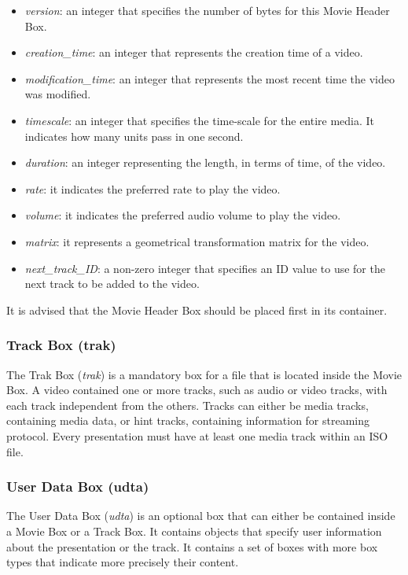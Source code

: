 \begin{itemize}
\item \emph{version}: an integer that specifies the number of bytes for this Movie Header Box.
\item \emph{creation\_time}: an integer that represents the creation time of a video.
\item \emph{modification\_time}: an integer that represents the most recent time the video was modified.
\item \emph{timescale}: an integer that specifies the time-scale for the entire media. It indicates how many units pass in one second.
\item \emph{duration}: an integer representing the length, in terms of time, of the video.
\item \emph{rate}: it indicates the preferred rate to play the video.
\item \emph{volume}: it indicates the preferred audio volume to play the video.
\item \emph{matrix}: it represents a geometrical transformation matrix for the video.
\item \emph{next\_track\_ID}: a non-zero integer that specifies an ID value to use for the next track to be added to the video.
\end{itemize}

It is advised that the Movie Header Box should be placed first in its container.

\subsubsection*{Track Box (trak)}

The Trak Box (\emph{trak}) is a mandatory box for a file that is located inside the Movie Box. A video contained one or more tracks, such as audio or video tracks, with each track independent from the others. Tracks can either be media tracks, containing media data, or hint tracks, containing information for streaming protocol. Every presentation must have at least one media track within an ISO file.

\subsubsection*{User Data Box (udta)}

The User Data Box (\emph{udta}) is an optional box that can either be contained inside a Movie Box or a Track Box. It contains objects that specify user information about the presentation or the track. It contains a set of boxes with more box types that indicate more precisely their content.

